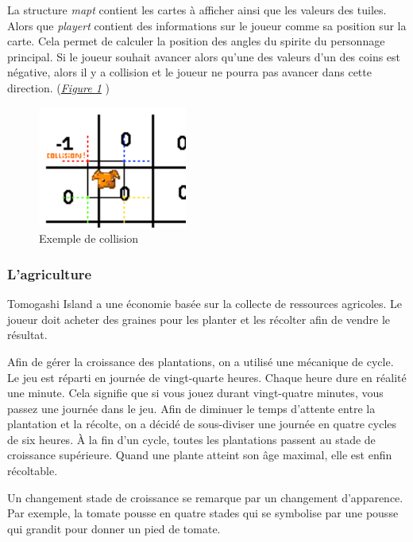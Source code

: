\documentclass{article}
\begin{document}
La structure \textit{map\textunderscore t} contient les cartes à afficher ainsi que les valeurs des tuiles. Alors que \textit{player\textunderscore t} contient des informations sur le joueur comme sa position sur la carte. Cela permet de calculer la position des angles du spirite du personnage principal. Si le joueur souhait avancer alors qu'une des valeurs d'un des coins est négative, alors il y a collision et le joueur ne pourra pas avancer dans cette direction. (\textit{\hyperref[fig:collions]{Figure \ref{fig:collions}}} )

        \begin{figure}[!h]  
            \includegraphics[height = 4cm]{exermple_collision.png}
            \centering
            \caption{Exemple de collision}
            \label{fig:collions}
        \end{figure}
        
        \subsubsection{L'agriculture}
        Tomogashi Island a une économie basée sur la collecte de ressources agricoles. Le joueur doit acheter des graines pour les planter et les récolter afin de vendre le résultat.

        

    
Afin de gérer la croissance des plantations, on a utilisé une mécanique de cycle. Le jeu est réparti en journée de vingt-quarte heures. Chaque heure dure en réalité une minute. Cela signifie que si vous jouez durant vingt-quatre minutes, vous passez une journée dans le jeu. Afin de diminuer le temps d’attente entre la plantation et la récolte, on a décidé de sous-diviser une journée en quatre cycles de six heures. À la fin d’un cycle, toutes les plantations passent au stade de croissance supérieure. Quand une plante atteint son âge maximal, elle est enfin récoltable.

Un changement stade de croissance se remarque par un changement d'apparence. Par exemple, la tomate pousse en quatre stades qui se symbolise par une pousse qui grandit pour donner un pied de tomate.
\end{document}
